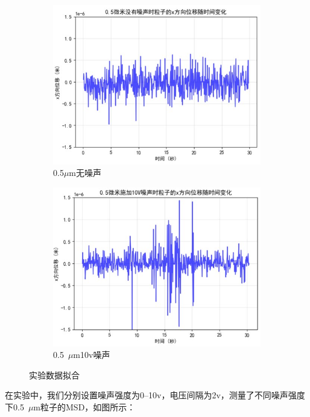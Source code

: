 \documentclass[a4paper]{report} %
\begin{document}
\begin{figure}[H]
    \centering
    \begin{subfigure}{0.45\textwidth}
        \includegraphics[width=\linewidth]{粒子1.jpg}
        \caption{0.5$\mu$m无噪声}
    \end{subfigure}
    \begin{subfigure}{0.45\textwidth}
        \includegraphics[width=\linewidth]{粒子2.jpg}
        \caption{0.5~$\mu$m10v噪声}
    \end{subfigure}

    \caption{实验数据拟合}
\end{figure}
在实验中，我们分别设置噪声强度为0--10v，电压间隔为2v，测量了不同噪声强度下0.5~$\mu$m粒子的MSD，如图所示：\par
\end{document}
